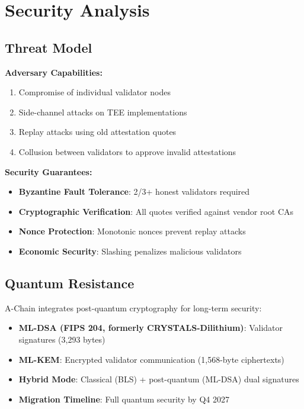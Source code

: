 \section{Security Analysis}


\subsection{Threat Model}

\textbf{Adversary Capabilities:}
\begin{enumerate}
\item Compromise of individual validator nodes
\item Side-channel attacks on TEE implementations
\item Replay attacks using old attestation quotes
\item Collusion between validators to approve invalid attestations
\end{enumerate}

\textbf{Security Guarantees:}
\begin{itemize}
\item \textbf{Byzantine Fault Tolerance}: 2/3+ honest validators required
\item \textbf{Cryptographic Verification}: All quotes verified against vendor root CAs
\item \textbf{Nonce Protection}: Monotonic nonces prevent replay attacks
\item \textbf{Economic Security}: Slashing penalizes malicious validators
\end{itemize}

\subsection{Quantum Resistance}

A-Chain integrates post-quantum cryptography for long-term security:

\begin{itemize}
\item \textbf{ML-DSA (FIPS 204, formerly CRYSTALS-Dilithium)}: Validator signatures (3,293 bytes)
\item \textbf{ML-KEM}: Encrypted validator communication (1,568-byte ciphertexts)
\item \textbf{Hybrid Mode}: Classical (BLS) + post-quantum (ML-DSA) dual signatures
\item \textbf{Migration Timeline}: Full quantum security by Q4 2027
\end{itemize}

